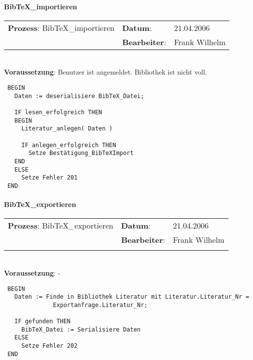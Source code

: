 \paragraph{BibTeX\_importieren}
\begin{tabular}[t]{p{9.5cm}ll}
\textbf{Prozess}: BibTeX\_importieren  	&\textbf{Datum}:      &21.04.2006\\
					&\textbf{Bearbeiter}: &Frank Wilhelm\\
\end{tabular}

\hrulefill\\
\textbf{Voraussetzung}: Benutzer ist angemeldet. Bibliothek ist nicht voll.
\begin{verbatim}
 BEGIN
   Daten := deserialisiere BibTeX_Datei;
   
   IF lesen_erfolgreich THEN
   BEGIN
     Literatur_anlegen( Daten )
     
     IF anlegen_erfolgreich THEN
       Setze Bestätigung_BibTeXImport
   END
   ELSE
     Setze Fehler 201
 END
\end{verbatim}
\hrulefill


\paragraph{BibTeX\_exportieren}
\begin{tabular}[t]{p{9.5cm}ll}
\textbf{Prozess}: BibTeX\_exportieren  	&\textbf{Datum}:      &21.04.2006\\
					&\textbf{Bearbeiter}: &Frank Wilhelm\\\\
\end{tabular}

\hrulefill\\
\textbf{Voraussetzung}: -
\begin{verbatim}
 BEGIN
   Daten := Finde in Bibliothek Literatur mit Literatur.Literatur_Nr = 
              Exportanfrage.Literatur_Nr;
  
   IF gefunden THEN
     BibTeX_Datei := Serialisiere Daten
   ELSE
     Setze Fehler 202
 END
\end{verbatim}

\hrulefill

